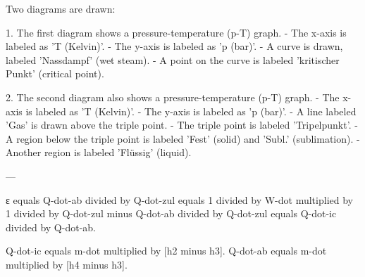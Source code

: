 Two diagrams are drawn:  

1. The first diagram shows a pressure-temperature (p-T) graph.  
   - The x-axis is labeled as 'T (Kelvin)'.  
   - The y-axis is labeled as 'p (bar)'.  
   - A curve is drawn, labeled 'Nassdampf' (wet steam).  
   - A point on the curve is labeled 'kritischer Punkt' (critical point).  

2. The second diagram also shows a pressure-temperature (p-T) graph.  
   - The x-axis is labeled as 'T (Kelvin)'.  
   - The y-axis is labeled as 'p (bar)'.  
   - A line labeled 'Gas' is drawn above the triple point.  
   - The triple point is labeled 'Tripelpunkt'.  
   - A region below the triple point is labeled 'Fest' (solid) and 'Subl.' (sublimation).  
   - Another region is labeled 'Flüssig' (liquid).  

---

ε equals Q-dot-ab divided by Q-dot-zul equals 1 divided by W-dot multiplied by 1 divided by Q-dot-zul minus Q-dot-ab divided by Q-dot-zul equals Q-dot-ic divided by Q-dot-ab.  

Q-dot-ic equals m-dot multiplied by [h2 minus h3].  
Q-dot-ab equals m-dot multiplied by [h4 minus h3].